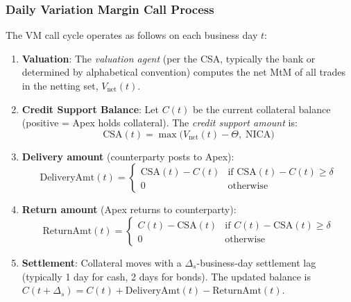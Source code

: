 \documentclass[11pt,a4paper]{article}
\begin{document}
\subsubsection{Daily Variation Margin Call Process}

The VM call cycle operates as follows on each business day $t$:

\begin{enumerate}
  \item \textbf{Valuation}: The \emph{valuation agent} (per the CSA, typically
        the bank or determined by alphabetical convention) computes the net
        MtM of all trades in the netting set, $V_{\text{net}}(t)$.
  \item \textbf{Credit Support Balance}: Let $C(t)$ be the current collateral
        balance (positive = Apex holds collateral). The \emph{credit support
        amount} is:
        \begin{equation}
          \text{CSA}(t) = \max\!\bigl(V_{\text{net}}(t) - \Theta,\; \text{NICA}\bigr)
          \label{eq:csa_amount}
        \end{equation}
  \item \textbf{Delivery amount} (counterparty posts to Apex):
        \begin{equation}
          \text{DeliveryAmt}(t) =
          \begin{cases}
            \text{CSA}(t) - C(t) & \text{if } \text{CSA}(t) - C(t) \geq \delta \\
            0 & \text{otherwise}
          \end{cases}
          \label{eq:delivery}
        \end{equation}
  \item \textbf{Return amount} (Apex returns to counterparty):
        \begin{equation}
          \text{ReturnAmt}(t) =
          \begin{cases}
            C(t) - \text{CSA}(t) & \text{if } C(t) - \text{CSA}(t) \geq \delta \\
            0 & \text{otherwise}
          \end{cases}
          \label{eq:return}
        \end{equation}
  \item \textbf{Settlement}: Collateral moves with a $\Delta_{s}$-business-day
        settlement lag (typically 1 day for cash, 2 days for bonds). The
        updated balance is $C(t + \Delta_s) = C(t) + \text{DeliveryAmt}(t)
        - \text{ReturnAmt}(t)$.
\end{enumerate}
\end{document}
